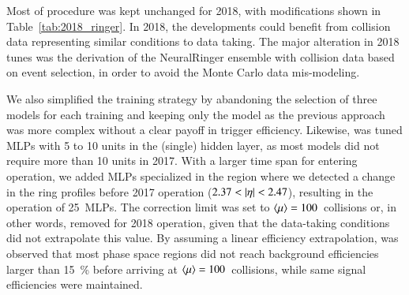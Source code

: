 Most of procedure was kept unchanged for 2018, with modifications shown in
Table~\ref{tab:2018_ringer}. In 2018, the developments could benefit from collision data representing similar conditions to data taking. The major alteration in 2018 tunes was the derivation of the NeuralRinger ensemble with collision data based on \Zee{} \tnp{} event selection, in order to avoid the Monte Carlo data mis-modeling.

We also simplified the training strategy by abandoning the selection of three
models for each training and keeping only the \spmax{} model as the previous approach was more complex without a clear
payoff in trigger efficiency.
Likewise, was tuned MLPs with 5 to 10 units in the (single) hidden layer, as most models did not require
more than 10 units in 2017. With a larger time span for entering operation, we
added MLPs specialized in the region where we detected a change in the ring
profiles before 2017 operation ($2.37<\abseta<2.47$), resulting in the operation of
\SI{25}{MLPs}. The correction limit was set to
$\langle \mu \rangle{}=100$~collisions or, in other words, removed for 2018 operation, given
that the data-taking conditions did not extrapolate this value. By assuming a
linear efficiency extrapolation,%
was observed that most phase space regions did not reach background efficiencies
larger than \SI{15}{\%} before arriving at $\langle \mu \rangle=100$~collisions, while same
signal efficiencies were maintained.






